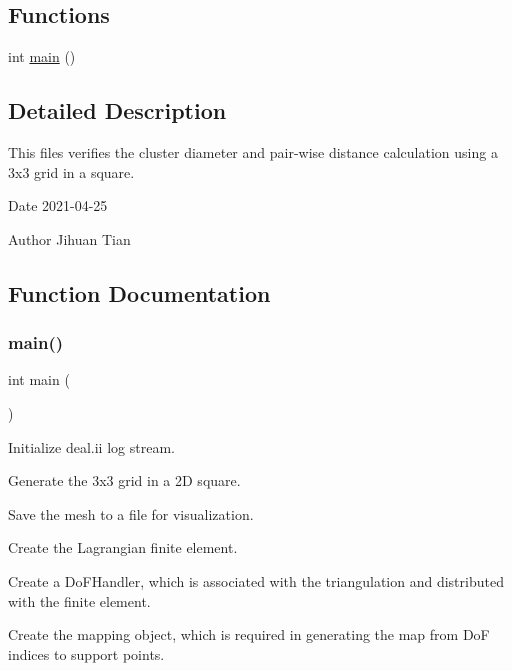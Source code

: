 \subsection*{Functions}
\begin{DoxyCompactItemize}
\item 
int \hyperlink{cluster-diameter_8cc_ae66f6b31b5ad750f1fe042a706a4e3d4}{main} ()
\end{DoxyCompactItemize}


\subsection{Detailed Description}
This files verifies the cluster diameter and pair-\/wise distance calculation using a 3x3 grid in a square. 

\begin{DoxyDate}{Date}
2021-\/04-\/25 
\end{DoxyDate}
\begin{DoxyAuthor}{Author}
Jihuan Tian 
\end{DoxyAuthor}


\subsection{Function Documentation}
\mbox{\label{cluster-diameter_8cc_ae66f6b31b5ad750f1fe042a706a4e3d4}} 
\subsubsection{\texorpdfstring{main()}{main()}}
{\footnotesize\ttfamily int main (\begin{DoxyParamCaption}{ }\end{DoxyParamCaption})}

Initialize deal.\+ii log stream.

Generate the 3x3 grid in a 2D square.

Save the mesh to a file for visualization.

Create the Lagrangian finite element.

Create a Do\+F\+Handler, which is associated with the triangulation and distributed with the finite element.

Create the mapping object, which is required in generating the map from DoF indices to support points.

